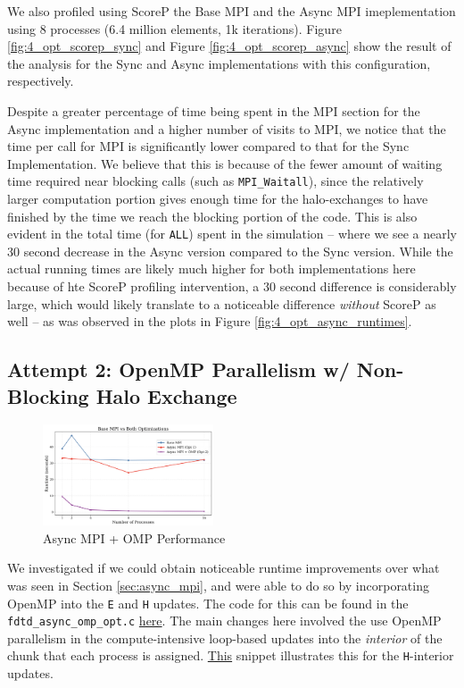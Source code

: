 \documentclass[a4paper,10pt]{article}
\begin{document}
\begin{multicols}{2}
We also profiled using ScoreP the Base MPI and the Async MPI imeplementation using 8 processes (6.4 million elements, 1k iterations). Figure \ref{fig:4_opt_scorep_sync} and Figure \ref{fig:4_opt_scorep_async} show the result of the analysis for the Sync and Async implementations with this configuration, respectively.  

Despite a greater percentage of time being spent in the MPI section for the Async implementation and a higher number of visits to MPI, we notice that the time per call for MPI is significantly lower compared to that for the Sync Implementation. We believe that this is because of the fewer amount of waiting time required near blocking calls (such as \verb|MPI_Waitall|), since the relatively larger computation portion gives enough time for the halo-exchanges to have finished by the time we reach the blocking portion of the code. This is also evident in the total time (for \verb|ALL|) spent in the simulation -- where we see a nearly 30 second decrease in the Async version compared to the Sync version. While the actual running times are likely much higher for both implementations here because of hte ScoreP profiling intervention, a 30 second difference is considerably large, which would likely translate to a noticeable difference \textit{without} ScoreP as well -- as was observed in the plots in Figure \ref{fig:4_opt_async_runtimes}.

\subsection{Attempt 2: OpenMP Parallelism w/ Non-Blocking Halo Exchange}
\begin{figure}[H]
  \centering
  \includegraphics[width=0.45\textwidth]{../images/4_opt/opt_all.png}
  \caption{Async MPI + OMP Performance}
   \label{fig:4_opt_all}
\end{figure}

We investigated if we could obtain noticeable runtime improvements over what was seen in Section \ref{sec:async_mpi}, and were able to do so by incorporating OpenMP into the \verb|E| and \verb|H| updates. The code for this can be found in the \verb|fdtd_async_omp_opt.c| \href{https://github.com/paulmyr/DD2356-MethodsHPC/blob/master/5_project/4_opt/fdtd_async_omp_opt.c}{here}. The main changes here involved the use OpenMP parallelism in the compute-intensive loop-based updates into the \textit{interior} of the chunk that each process is assigned. \href{https://github.com/paulmyr/DD2356-MethodsHPC/blob/master/5_project/4_opt/fdtd_async_omp_opt.c#L61}{This} snippet illustrates this for the \verb|H|-interior updates. 


\end{multicols}
\end{document}

